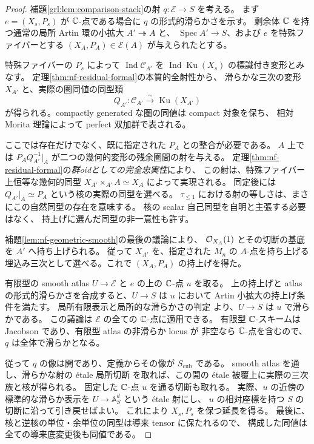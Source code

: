 \begin{proof}
補題\ref{grl:lem:comparison-stack}の射 $q:\mathcal E\to S$ を考える。
まず $e=(X_s,P_s)$ が $\mathbb C$-点である場合に $q$ の形式的滑らかさを示す。
剰余体 $\mathbb C$ を持つ通常の局所 Artin 環の小拡大 $A'\twoheadrightarrow A$ と、
$\operatorname{Spec}A'\to S$、および $e$ を特殊ファイバーとする
$(X_A,P_A)\in\mathcal E(A)$ が与えられたとする。

特殊ファイバーの $P_s$ によって
$\operatorname{Ind}\mathcal C_{A'}$ を
$\operatorname{Ind}\operatorname{Ku}(X_s)$ の標識付き変形とみなす。
定理\ref{thm:nf-residual-formal}の本質的全射性から、
滑らかな三次の変形 $X_{A'}$ と、実際の圏同値の同型類
\[
 Q_{A'}:\mathcal C_{A'}\xrightarrow{\sim}\operatorname{Ku}(X_{A'})
\]
が得られる。compactly generated な圏の同値は compact 対象を保ち、
相対 Morita 理論によって perfect 双加群で表される。

ここでは存在だけでなく、既に指定された $P_A$ との整合が必要である。
$A$ 上では $P_AQ_{A'}^{-1}|_A$ が二つの幾何的変形の残余圏間の射を与える。
定理\ref{thm:nf-residual-formal}の\emph{群oidとしての完全忠実性}により、
この射は、特殊ファイバー上恒等な幾何的同型
$X_{A'}\times_{A'}A\simeq X_A$ によって実現される。
同定後には $Q_{A'}|_A\simeq P_A$ という核の実際の同型を選べる。
$\tau_{\le1}$ における射の等しさは、まさにこの自然同型の存在を意味する。
核の scalar 自己同型を自明と主張する必要はなく、
持上げに選んだ同型の非一意性も許す。

補題\ref{lem:nf-geometric-smooth}の最後の議論により、
$\mathcal O_{X_A}(1)$ とその切断の基底を $A'$ へ持ち上げられる。
従って $X_{A'}$ を、指定された $M_n$ の $A$-点を持ち上げる
埋込み三次として選べる。これで $(X_A,P_A)$ の持上げを得た。

有限型の smooth atlas $U\to\mathcal E$ と $e$ の上の $\mathbb C$-点 $u$ を取る。
上の持上げと atlas の形式的滑らかさを合成すると、$U\to S$ は
$u$ において Artin 小拡大の持上げ条件を満たす。
局所有限表示と局所的な滑らかさの判定
\cite[Tag~02HX]{NFMStacksSmoothLocal}
より、$U\to S$ は $u$ で滑らかである。
この議論は $\mathcal E$ の全ての $\mathbb C$-点に適用できる。
有限型 $\mathbb C$-スキームは Jacobson であり、有限型 atlas の非滑らか locus が
非空なら $\mathbb C$-点を含むので、$q$ は全体で滑らかとなる。

従って $q$ の像は開であり、定義からその像が $S_{\mathrm{cub}}$ である。
smooth atlas を通し、滑らかな射の \'etale 局所切断
\cite[Tag~055U]{NFMStacksSmoothLocal}
を取れば、この開の \'etale 被覆上に実際の三次族と核が得られる。
固定した $\mathbb C$-点 $u$ を通る切断も取れる。
実際、$u$ の近傍の標準的な滑らか表示を
$U\to\mathbb A^d_S$ という \'etale 射にし、
$u$ の相対座標を持つ $S$ の切断に沿って引き戻せばよい。
これにより $X_s,P_s$ を保つ延長を得る。
最後に、核と逆核の単位・余単位の同型は導来 tensor に保たれるので、
構成した同値は全ての導来底変更後も同値である。
\end{proof}

